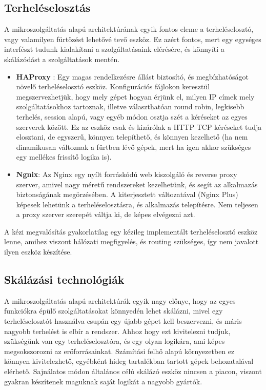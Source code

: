 \documentclass[11pt,magyar,a4paper,twoside,]{report}
\begin{document}
\subsection{Terheléselosztás}\label{terheluxe9selosztuxe1s}

A mikroszolgáltatás alapú architektúrának egyik fontos eleme a
terheléselosztó, vagy valamilyen fürtözést lehetővé tevő eszköz. Ez
azért fontos, mert egy egységes interfészt tudunk kialakítani a
szolgáltatásaink elérésére, és könnyíti a skálázódást a szolgáltatások
mentén.

\begin{itemize}
\item
  \textbf{HAProxy}\citep{haproxy} \citep{LB-haproxy}: Egy magas
  rendelkezésre állást biztosító, és megbízhatóságot növelő
  terheléselosztó eszköz. Konfigurációs fájlokon keresztül
  megszervezhetjük, hogy mely gépet hogyan érjünk el, milyen IP címek
  mely szolgáltatásokhoz tartoznak, illetve választhatóan round robin,
  legkisebb terhelés, session alapú, vagy egyéb módon osztja szét a
  kéréseket az egyes szerverek között. Ez az eszköz csak és kizárólak a
  HTTP TCP kéréseket tudja elosztani, de egyszerű, könnyen telepíthető,
  és könnyen kezelhető (ha nem dinamikusan változnak a fürtben lévő
  gépek, mert ha igen akkor szükséges egy mellékes frissítő logika is).
\item
  \textbf{Ngnix}\citep{nginx}: Az Nginx egy nyílt forráskódú web
  kiszolgáló és reverse proxy szerver, amivel nagy méretű rendszereket
  kezelhetünk, és segít az alkalmazás biztonságának megörzésében. A
  kiterjesztett változatával (Nginx Plus) képesek lehetünk a
  terheléselosztásra, és alkalmazás telepítésre. Nem teljesen a proxy
  szerver szerepét váltja ki, de képes elvégezni azt.
\end{itemize}

A kézi megvalósítás gyakorlatilag egy kézileg implementált
terheléselosztó eszköz lenne, amihez viszont hálózati megfigyelés, és
routing szükséges, így nem javalott ilyen eszköz készítése.

\subsection{Skálázási
technológiák}\label{skuxe1luxe1zuxe1si-technoluxf3giuxe1k}

A mikroszolgáltatás alapú architektúrák egyik nagy előnye, hogy az egyes
funkciókra épülő szolgáltatásokat könnyedén lehet skálázni, mivel egy
terheléselosztót használva csupán egy újabb gépet kell beszervezni, és
máris nagyobb terhelést is elbír a rendszer. Ahhoz hogy ezt kivitelezni
tudjuk, szükségünk van egy terheléselosztóra, és egy olyan logikára, ami
képes megsokszorozni az erőforrásainkat. Számítási felhő alapú
környezetben ez könnyen kivitelezhető, egyébként hideg tartalékban
tartott gépek behozatalával elérhető. Sajnálatos módon általános célú
skálázó eszköz nincsen a piacon, viszont gyakran készítenek maguknak
saját logikát a nagyobb gyártók.
\end{document}
